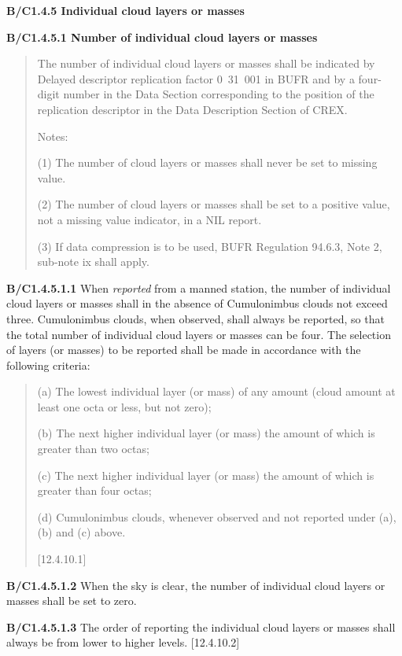 \textbf{B/C1.4.5 Individual cloud layers or masses}

\textbf{B/C1.4.5.1 Number of individual cloud layers or masses}

\begin{quote}
The number of individual cloud layers or masses shall be indicated by Delayed descriptor replication factor 0~31~001 in BUFR and by a four-digit number in the Data Section corresponding to the position of the replication descriptor in the Data Description Section of CREX.

Notes:

(1) The number of cloud layers or masses shall never be set to missing value.

(2) The number of cloud layers or masses shall be set to a positive value, not a missing value indicator, in a NIL report.

(3) If data compression is to be used, BUFR Regulation 94.6.3, Note 2, sub-note ix shall apply.
\end{quote}

\textbf{B/C1.4.5.1.1} When \emph{reported} from a manned station, the number of individual cloud layers or masses shall in the absence of Cumulonimbus clouds not exceed three. Cumulonimbus clouds, when observed, shall always be reported, so that the total number of individual cloud layers or masses can be four. The selection of layers (or masses) to be reported shall be made in accordance with the following criteria:

\begin{quote}
(a) The lowest individual layer (or mass) of any amount (cloud amount at least one octa or less, but not zero);

(b) The next higher individual layer (or mass) the amount of which is greater than two octas;

(c) The next higher individual layer (or mass) the amount of which is greater than four octas;

(d) Cumulonimbus clouds, whenever observed and not reported under (a), (b) and (c) above.

{[}12.4.10.1{]}
\end{quote}

\textbf{B/C1.4.5.1.2} When the sky is clear, the number of individual cloud layers or masses shall be set to zero.

\textbf{B/C1.4.5.1.3} The order of reporting the individual cloud layers or masses shall always be from lower to higher levels. {[}12.4.10.2{]}


